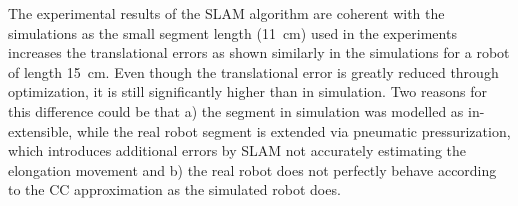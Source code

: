 The experimental results of the \gls{SLAM} algorithm are coherent with the simulations as the small segment length (\SI{11}{cm}) used in the experiments increases the translational errors as shown similarly in the simulations for a robot of length \SI{15}{cm}.
Even though the translational error is greatly reduced through optimization, it is still significantly higher than in simulation. Two reasons for this difference could be that a) the segment in simulation was modelled as in-extensible, while the real robot segment is extended via pneumatic pressurization, which introduces additional errors by \gls{SLAM} not accurately estimating the elongation movement and b) the real robot does not perfectly behave according to the \gls{CC} approximation as the simulated robot does.


